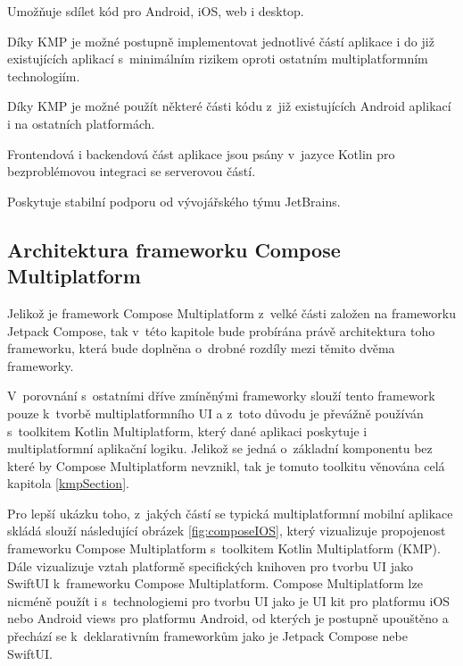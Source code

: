 Umožňuje sdílet kód pro Android, iOS, web i desktop. \cite{composeMultiplatform}

Díky KMP je možné postupně implementovat jednotlivé částí aplikace i do již existujících aplikací s~minimálním rizikem oproti
ostatním multiplatformním technologiím. \cite{KMP}

Díky KMP je možné použít některé části kódu z~již existujících Android aplikací i na ostatních platformách.

Frontendová i backendová část aplikace jsou psány v~jazyce Kotlin pro bezproblémovou integraci se serverovou částí.

Poskytuje stabilní podporu od vývojářského týmu JetBrains.

\subsection*{Architektura frameworku Compose Multiplatform} \label{ComposeArch}
Jelikož je framework Compose Multiplatform z~velké části založen na frameworku Jetpack Compose, tak v~této kapitole bude probírána
právě architektura toho frameworku, která bude doplněna o~drobné rozdíly mezi těmito dvěma frameworky.

V~porovnání s~ostatními dříve zmíněnými frameworky slouží tento framework pouze k~tvorbě multiplatformního UI a z~toto důvodu je převážně 
používán s~toolkitem Kotlin Multiplatform, který dané aplikaci poskytuje i multiplatformní aplikační logiku. Jelikož se jedná o~základní 
komponentu bez které by Compose Multiplatform nevznikl, tak je tomuto toolkitu věnována celá kapitola \ref{kmpSection}.

Pro lepší ukázku toho, z~jakých částí se typická multiplatformní mobilní aplikace skládá slouží následující obrázek \ref{fig:composeIOS}, který
vizualizuje propojenost frameworku Compose Multiplatform s~toolkitem Kotlin Multiplatform (KMP). Dále vizualizuje 
vztah platformě specifických knihoven pro tvorbu UI jako SwiftUI k~frameworku Compose Multiplatform.
Compose Multiplatform lze nicméně použít i s~technologiemi pro tvorbu UI jako je UI kit pro platformu iOS nebo
Android views  pro platformu Android, od kterých je postupně upouštěno a přechází se k~deklarativním frameworkům jako je Jetpack Compose nebe SwiftUI.  

